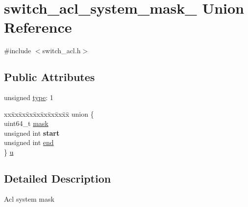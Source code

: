 \hypertarget{unionswitch__acl__system__mask__}{\section{switch\+\_\+acl\+\_\+system\+\_\+mask\+\_\+ Union Reference}
\label{unionswitch__acl__system__mask__}
}


{\ttfamily \#include $<$switch\+\_\+acl.\+h$>$}

\subsection*{Public Attributes}
\begin{DoxyCompactItemize}
\item 
unsigned \hyperlink{unionswitch__acl__system__mask___a6ed8653c33d95bc0e0f30a14fe7f4998}{type}\+: 1
\item 
\begin{tabbing}
xx\=xx\=xx\=xx\=xx\=xx\=xx\=xx\=xx\=\kill
union \{\\
\>uint64\_t \hyperlink{unionswitch__acl__system__mask___a8c6a54e7156ab1d71239f7cd69d15edc}{mask}\\
\>unsigned int {\bfseries start}\\
\>unsigned int \hyperlink{unionswitch__acl__system__mask___ac5a432e4432f54d5b996c1c64a63be61}{end}\\
\} \hyperlink{unionswitch__acl__system__mask___a9dd06dc254bca87f582a7e0b7070dc8d}{u}\\

\end{tabbing}\end{DoxyCompactItemize}


\subsection{Detailed Description}
Acl system mask 

